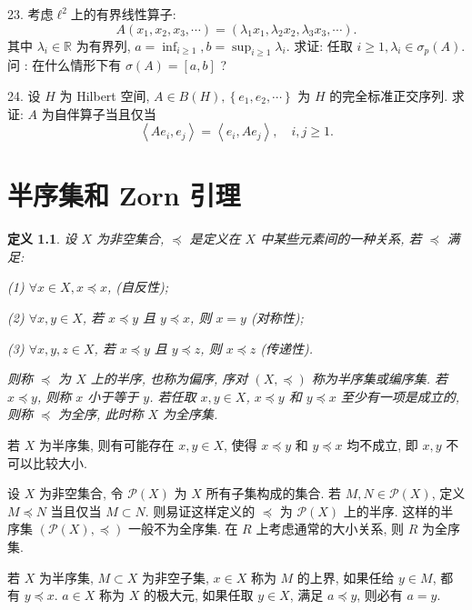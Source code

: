 \documentclass[openany]{ctexbook}
\theoremstyle{kaiti}
\newtheorem{definition}{定义}[section]
\theoremstyle{normal}
\begin{document}
23. 考虑$\ell^2$上的有界线性算子:
$$
A\left(x_1, x_2, x_3, \cdots\right)=\left(\lambda_1 x_1, \lambda_2 x_2, \lambda_3 x_3, \cdots\right).
$$
其中 $\lambda_{i} \in \mathbb{R}$ 为有界列, $a=\inf_{i \geqslant 1}, b=\sup_{i \geqslant 1} \lambda_{i}$. 求证: 任取 $i \geqslant 1, \lambda_{i} \in \sigma_{p}(A)$. 问 : 在什么情形下有 $\sigma(A)=[a, b]$ ?

24. 设 $H$ 为 Hilbert 空间, $A \in B(H),\left\{e_1, e_2, \cdots\right\}$ 为 $H$ 的完全标准正交序列. 求证: $A$ 为自伴算子当且仅当
$$
\left\langle A e_{i}, e_{j}\right\rangle=\left\langle e_{i}, A e_{j}\right\rangle, \quad i, j \geqslant 1.
$$

\appendix

\chapter{半序集和 Zorn 引理}

\begin{definition}
设 $X$ 为非空集合, $\preccurlyeq$ 是定义在 $X$ 中某些元素间的一种关系, 若 $\preccurlyeq$ 满足:

(1) $\forall x \in X, x \preccurlyeq x$, (自反性);

(2) $\forall x, y \in X$, 若 $x \preccurlyeq y$ 且 $y \preccurlyeq x$, 则 $x=y$ (对称性);

(3) $\forall x, y, z \in X$, 若 $x \preccurlyeq y$ 且 $y \preccurlyeq z$, 则 $x \preccurlyeq z$ (传递性).

则称 $\preccurlyeq$ 为 $X$ 上的半序, 也称为偏序, 序对 $(X, \preccurlyeq)$ 称为半序集或编序集. 若 $x \preccurlyeq y$, 则称 $x$ 小于等于 $y$. 若任取 $x, y \in X$, $x \preccurlyeq y$ 和 $y \preccurlyeq x$ 至少有一项是成立的, 则称 $\preccurlyeq$ 为全序, 此时称 $X$ 为全序集.
\end{definition}

若 $X$ 为半序集, 则有可能存在 $x, y \in X$, 使得 $x \preccurlyeq y$ 和 $y \preccurlyeq x$ 均不成立, 即 $x, y$ 不可以比较大小.

设 $X$ 为非空集合, 令 $\mathcal{P}(X)$ 为 $X$ 所有子集构成的集合. 若 $M, N \in \mathcal{P}(X)$, 定义 $M \preccurlyeq N$ 当且仅当 $M \subset N$. 则易证这样定义的 $\preccurlyeq$ 为 $\mathcal{P}(X)$ 上的半序. 这样的半序集 $(\mathcal{P}(X), \preccurlyeq)$ 一般不为全序集. 在 $R$ 上考虑通常的大小关系, 则 $R$ 为全序集.

若 $X$ 为半序集, $M \subset X$ 为非空子集, $x \in X$ 称为 $M$ 的上界, 如果任给 $y \in M$, 都有 $y \preccurlyeq x$. $a \in X$ 称为 $X$ 的极大元, 如果任取 $y \in X$, 满足 $a \preccurlyeq y$, 则必有 $a=y$.
\end{document}
